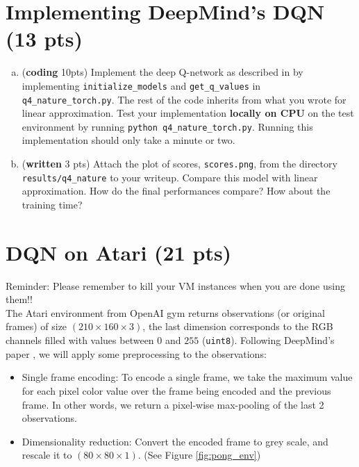 \documentclass{article}
\newif\ifanswers
\newenvironment{myitemize}
{ \begin{itemize}
    \setlength{\itemsep}{0pt}
    \setlength{\parskip}{0pt}
    \setlength{\parsep}{0pt}     }
  { \end{itemize}                  }
\newcommand{\ifans}[1]{\ifanswers \color{red} \textbf{Solution: } #1 \color{black} \else {} \fi}
\begin{document}
\section{Implementing DeepMind's DQN (13 pts)}

\begin{enumerate}[(a)]

\item (\textbf{coding} 10pts) Implement the deep Q-network as described in \cite{mnih2015human} by implementing \texttt{initialize\_models} and \texttt{get\_q\_values} in \texttt{q4\_nature\_torch.py}. The rest of the code inherits from what you wrote for linear approximation. Test your implementation \textbf{locally on CPU} on the test environment by running \texttt{python q4\_nature\_torch.py}.  Running this implementation should only take a minute or two.

\item (\textbf{written} 3 pts) Attach the plot of scores, \texttt{scores.png}, from the directory \texttt{results/q4\_nature} to your writeup. Compare this model with linear approximation. How do the final performances compare? How about the training time? 

\ifans{
}

\end{enumerate}

\section{DQN on Atari (21 pts)}

Reminder: Please remember to kill your VM instances when you are done using them!! \\

The Atari environment from OpenAI gym returns observations (or original frames) of size $ (210 \times 160 \times 3) $, the last dimension corresponds to the RGB channels filled with values between $ 0 $ and $ 255 $ (\texttt{uint8}). Following DeepMind's paper \cite{mnih2015human}, we will apply some preprocessing to the observations:   
\begin{myitemize}
\item Single frame encoding: To encode a single frame, we take the maximum value for each pixel color value over the frame being encoded and the previous frame. In other words, we return a pixel-wise max-pooling of the last 2 observations.     
\item Dimensionality reduction: Convert the encoded frame to grey scale, and rescale it to $(80 \times 80 \times 1)$. (See Figure \ref{fig:pong_env})     
\end{myitemize}
\end{document}
